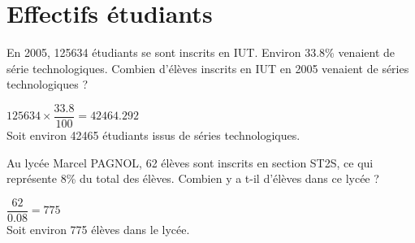 \section{Effectifs étudiants}
	
	\begin{questions}
		\question En 2005, \num{125634} étudiants se sont inscrits en IUT. Environ \num{33.8}\% venaient de série technologiques. Combien d'élèves inscrits en IUT en 2005 venaient de séries technologiques ?
		\begin{solution}
			$ \num{125634} \times \dfrac{\num{33.8}}{100} = \num{42464.292} $ \\
			Soit environ \num{42465} étudiants issus de séries technologiques.
		\end{solution}
		
		\question Au lycée Marcel PAGNOL, 62 élèves sont inscrits en section ST2S, ce qui représente 8\% du total des élèves. Combien y a t-il d'élèves dans ce lycée ?
		\begin{solution}
			$ \dfrac{\num{62}}{\num{0.08}} = 775 $ \\
			Soit environ 775 élèves dans le lycée.
		\end{solution}
	\end{questions}